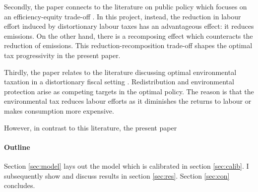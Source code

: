 Secondly, the paper connects to the literature on public policy which focuses on an efficiency-equity trade-off \citep{Heathcote2017OptimalFramework, Loebbing2019NationalChange}. In this project, instead, the reduction in labour effort induced by distortionary labour taxes has an advantageous effect: it reduces emissions. On the other hand, there is a recomposing effect which counteracts the reduction of emissions. This reduction-recomposition trade-off shapes the optimal tax progressivity in the present paper. 


Thirdly, the paper relates to the literature discussing optimal environmental taxation in a distortionary fiscal setting \citep{Bovenberg1997EnvironmentalGrowth, Barrage2019OptimalPolicy, LansBovenberg1994EnvironmentalTaxation}. Redistribution and environmental protection arise as competing targets in the optimal policy. The reason is that the environmental tax reduces labour efforts as it diminishes the returns to labour or makes consumption more expensive.  

However, in contrast to this literature, the present paper 


\paragraph{Outline} Section \ref{sec:model} lays out the model which is calibrated in section \ref{sec:calib}. I subsequently show and discuss results in section \ref{sec:res}. Section \ref{sec:con} concludes. 